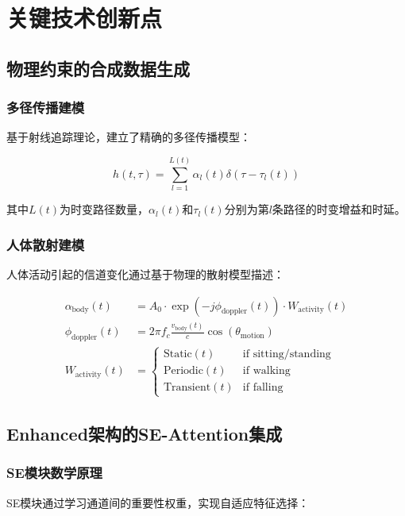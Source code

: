 \section{关键技术创新点}
\label{sec:innovations}

\subsection{物理约束的合成数据生成}
\label{subsec:physics_constrained}

\subsubsection{多径传播建模}
基于射线追踪理论，建立了精确的多径传播模型：

\begin{equation}
h(t, \tau) = \sum_{l=1}^{L(t)} \alpha_l(t) \delta(\tau - \tau_l(t))
\label{eq:multipath_model}
\end{equation}

其中$L(t)$为时变路径数量，$\alpha_l(t)$和$\tau_l(t)$分别为第$l$条路径的时变增益和时延。

\subsubsection{人体散射建模}
人体活动引起的信道变化通过基于物理的散射模型描述：

\begin{align}
\alpha_{\text{body}}(t) &= A_0 \cdot \exp(-j\phi_{\text{doppler}}(t)) \cdot W_{\text{activity}}(t) \\
\phi_{\text{doppler}}(t) &= 2\pi f_c \frac{v_{\text{body}}(t)}{c} \cos(\theta_{\text{motion}}) \\
W_{\text{activity}}(t) &= \begin{cases}
\text{Static}(t) & \text{if sitting/standing} \\
\text{Periodic}(t) & \text{if walking} \\
\text{Transient}(t) & \text{if falling}
\end{cases}
\end{align}

\subsection{Enhanced架构的SE-Attention集成}
\label{subsec:se_attention}

\subsubsection{SE模块数学原理}
SE模块通过学习通道间的重要性权重，实现自适应特征选择：

